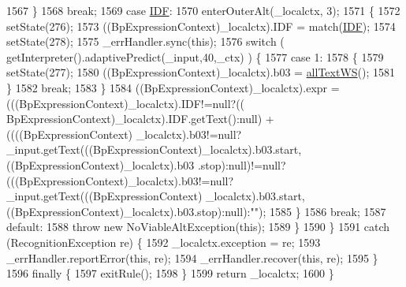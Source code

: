 \begin{DoxyCode}
1567         \}
1568         \textcolor{keywordflow}{break};
1569       \textcolor{keywordflow}{case} \hyperlink{classgov_1_1nasa_1_1jpf_1_1inspector_1_1client_1_1parser_1_1_console_grammar_parser_ae9d41d0f0abda3e06c7f452164d2e3a0}{IDF}:
1570         enterOuterAlt(\_localctx, 3);
1571         \{
1572         setState(276);
1573         ((BpExpressionContext)\_localctx).IDF = match(\hyperlink{classgov_1_1nasa_1_1jpf_1_1inspector_1_1client_1_1parser_1_1_console_grammar_parser_ae9d41d0f0abda3e06c7f452164d2e3a0}{IDF});
1574         setState(278);
1575         \_errHandler.sync(\textcolor{keyword}{this});
1576         \textcolor{keywordflow}{switch} ( getInterpreter().adaptivePredict(\_input,40,\_ctx) ) \{
1577         \textcolor{keywordflow}{case} 1:
1578           \{
1579           setState(277);
1580           ((BpExpressionContext)\_localctx).b03 = \hyperlink{classgov_1_1nasa_1_1jpf_1_1inspector_1_1client_1_1parser_1_1_console_grammar_parser_adc161fc81eedd939154fd25e889f5b28}{allTextWS}();
1581           \}
1582           \textcolor{keywordflow}{break};
1583         \}
1584          ((BpExpressionContext)\_localctx).expr =  (((BpExpressionContext)\_localctx).IDF!=null?((
      BpExpressionContext)\_localctx).IDF.getText():null) +                                    ((((BpExpressionContext)
      \_localctx).b03!=null?\_input.getText(((BpExpressionContext)\_localctx).b03.start,((BpExpressionContext)\_localctx).b03
      .stop):null)!=null?(((BpExpressionContext)\_localctx).b03!=null?\_input.getText(((BpExpressionContext)
      \_localctx).b03.start,((BpExpressionContext)\_localctx).b03.stop):null):\textcolor{stringliteral}{""}); 
1585         \}
1586         \textcolor{keywordflow}{break};
1587       \textcolor{keywordflow}{default}:
1588         \textcolor{keywordflow}{throw} \textcolor{keyword}{new} NoViableAltException(\textcolor{keyword}{this});
1589       \}
1590     \}
1591     \textcolor{keywordflow}{catch} (RecognitionException re) \{
1592       \_localctx.exception = re;
1593       \_errHandler.reportError(\textcolor{keyword}{this}, re);
1594       \_errHandler.recover(\textcolor{keyword}{this}, re);
1595     \}
1596     \textcolor{keywordflow}{finally} \{
1597       exitRule();
1598     \}
1599     \textcolor{keywordflow}{return} \_localctx;
1600   \}
\end{DoxyCode}
